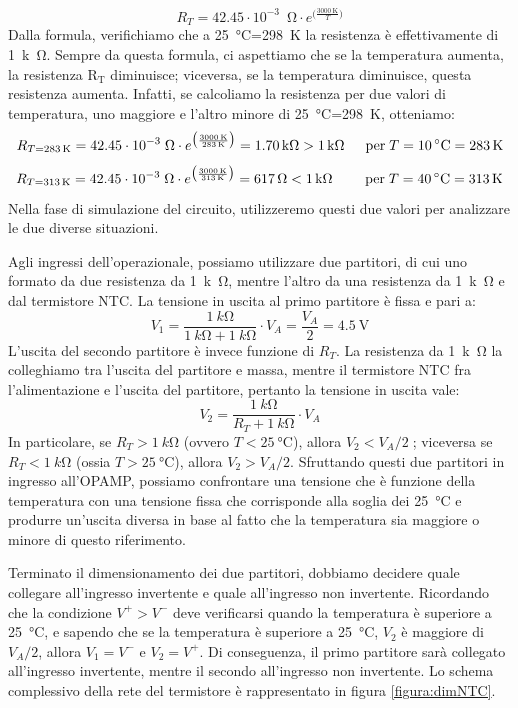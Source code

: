\documentclass{report}
\begin{document}
$$R_T = 42.45\cdot 10^{-3}\;\SI{}{\ohm}\cdot e^{\bigl(\frac{\SI{3000}{\kelvin}}{T}\bigr)} $$
Dalla formula, verifichiamo che a \SI{25}{\celsius}=\SI{298}{\kelvin} la resistenza è effettivamente di \SI{1}{k\ohm}. Sempre da questa formula, ci aspettiamo che se la temperatura aumenta, la resistenza $\mathrm{R_T}$ diminuisce; viceversa, se la temperatura diminuisce, questa resistenza aumenta. Infatti, se calcoliamo la resistenza per due valori di temperatura, uno maggiore e l'altro minore di \SI{25}{\celsius}=\SI{298}{\kelvin}, otteniamo:
$$R_{T=\SI{283}{\kelvin}} = 42.45\cdot 10^{-3}\;\SI{}{\ohm}\cdot e^{\bigl(\frac{\SI{3000}{\kelvin}}{\SI{283}{\kelvin}}\bigr)}=\SI{1.70}{k\ohm}>\SI{1}{k\ohm}\indent\mathrm{per \;}T = \SI{10}{\celsius}=\SI{283}{\kelvin}$$
$$R_{T=\SI{313}{\kelvin}} = 42.45\cdot 10^{-3}\;\SI{}{\ohm}\cdot e^{\bigl(\frac{\SI{3000}{\kelvin}}{\SI{313}{\kelvin}}\bigr)}=\SI{617}{\ohm}<\SI{1}{k\ohm}\;\;\;\indent\mathrm{per \;}T = \SI{40}{\celsius}=\SI{313}{\kelvin}$$
Nella fase di simulazione del circuito, utilizzeremo questi due valori per analizzare le due diverse situazioni. \par
Agli ingressi dell'operazionale, possiamo utilizzare due partitori, di cui uno formato da due resistenza da \SI{1}{k\ohm}, mentre l'altro da una resistenza da \SI{1}{k\ohm} e dal termistore NTC. La tensione in uscita al primo partitore è fissa e pari a:
$$V_1 = \frac{\SI{1}{k\ohm}}{\SI{1}{k\ohm}+\SI{1}{k\ohm}}\cdot V_A = \frac{V_A}{2} = \SI{4.5}{\volt}$$
L'uscita del secondo partitore è invece funzione di $R_T$. La resistenza da \SI{1}{k\ohm} la colleghiamo tra l'uscita del partitore e massa, mentre il termistore NTC fra l'alimentazione e l'uscita del partitore, pertanto la tensione in uscita vale:
$$V_2 = \frac{\SI{1}{k\ohm}}{R_T+\SI{1}{k\ohm}}\cdot V_A$$
In particolare, se $R_T>\SI{1}{k\ohm}$ (ovvero $T<\SI{25}{\celsius}$), allora $V_2<V_A/2\;$; viceversa se $R_T<\SI{1}{k\ohm}$ (ossia $T>\SI{25}{\celsius}$), allora $V_2>V_A/2$. Sfruttando questi due partitori in ingresso all'OPAMP, possiamo confrontare una tensione che è funzione della temperatura con una tensione fissa che corrisponde alla soglia dei \SI{25}{\celsius} e produrre un'uscita diversa in base al fatto che la temperatura sia maggiore o minore di questo riferimento. \par
Terminato il dimensionamento dei due partitori, dobbiamo decidere quale collegare all'ingresso invertente e quale all'ingresso non invertente. Ricordando che la condizione $V^+>V^-$ deve verificarsi quando la temperatura è superiore a \SI{25}{\celsius}, e sapendo che se la temperatura è superiore a \SI{25}{\celsius}, $V_2$ è maggiore di $V_A/2$, allora $V_1=V^-$ e $V_2=V^+$. Di conseguenza, il primo partitore sarà collegato all'ingresso invertente, mentre il secondo all'ingresso non invertente. Lo schema complessivo della rete del termistore è rappresentato in figura \ref{figura:dimNTC}. \par
\end{document}
